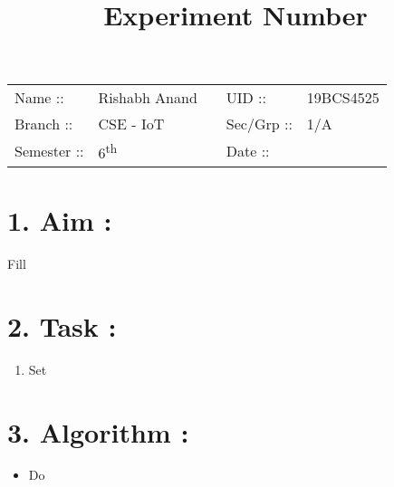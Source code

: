 \documentclass[14pt]{extarticle}
\title{%
    \textbf{
    \vspace{-3em} \\
    \Large Experiment Number\\
    \vspace{-4em}
    }
}
\author{}
\date{}
\begin{document}
\maketitle %

\section*{}
    \begin{tabular}{ llp{2cm}ll }
        Name :: & Rishabh Anand & & UID :: & 19BCS4525  \\
        Branch :: & CSE - IoT & & Sec/Grp :: & 1/A \\
        Semester :: & 6\textsuperscript{th} & & Date :: & \shortdate{\today} \\
    \end{tabular}

\vspace{1em}

\section*{\normalsize 1. Aim :}

Fill

\section*{\normalsize 2. Task :}

\begin{enumerate}
  \item Set
\end{enumerate}


\section*{\normalsize 3. Algorithm :}

\begin{itemize}
  \item Do
\end{itemize}
\end{document}
